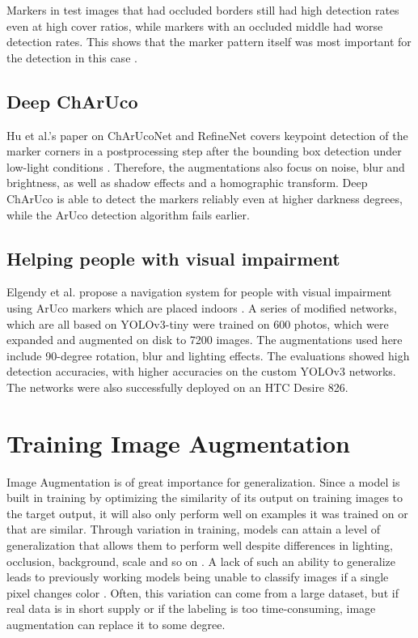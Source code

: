 \documentclass[10pt]{book}
\begin{document}
Markers in test images that had occluded borders still had high detection rates even at high cover ratios, while markers with an occluded middle had worse detection rates. This shows that the marker pattern itself was most important for the detection in this case \cite{li2020aruco}.

\subsection{Deep ChArUco}

Hu et al.'s paper on ChArUcoNet and RefineNet covers keypoint detection of the marker corners in a postprocessing step after the bounding box detection under low-light conditions \cite{hu2019deep}. Therefore, the augmentations also focus on noise, blur and brightness, as well as shadow effects and a homographic transform. Deep ChArUco is able to detect the markers reliably even at higher darkness degrees, while the \ac{ArUco} detection algorithm fails earlier. 

\subsection{Helping people with visual impairment}

Elgendy et al. propose a navigation system for people with visual impairment using \ac{ArUco} markers which are placed indoors \cite{elgendy2021novel}. A series of modified networks, which are all based on \ac{YOLO}v3-tiny were trained on 600 photos, which were expanded and augmented on disk to 7200 images. The augmentations used here include 90-degree rotation, blur and lighting effects. The evaluations showed high detection accuracies, with higher accuracies on the custom \ac{YOLO}v3 networks. The networks were also successfully deployed on an HTC Desire 826.

\section{Training Image Augmentation}

Image Augmentation is of great importance for generalization. Since a model is built in training by optimizing the similarity of its output on training images to the target output, it will also only perform well on examples it was trained on or that are similar. Through variation in training, models can attain a level of generalization that allows them to perform well despite differences in lighting, occlusion, background, scale and so on \cite{shorten2019survey}. A lack of such an ability to generalize leads to previously working models being unable to classify images if a single pixel changes color \cite{8601309}. Often, this variation can come from a large dataset, but if real data is in short supply or if the labeling is too time-consuming, image augmentation can replace it to some degree.
\end{document}
